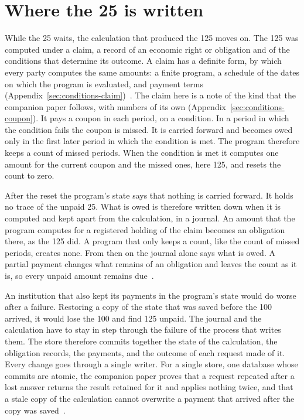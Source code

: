 \documentclass{momentum}
\begin{document}
\section{Where the 25 is written}
\label{sec:coupon}
\label{sec:history}

While the 25 waits, the calculation that produced the 125 moves on. The 125 was computed under a claim, a record of an economic right or obligation and of the conditions that determine its outcome. A claim has a definite form, by which every party computes the same amounts: a finite program, a schedule of the dates on which the program is evaluated, and payment terms (Appendix~\ref{sec:conditions-claim})~\cite{claim}. The claim here is a note of the kind that the companion paper follows, with numbers of its own (Appendix~\ref{sec:conditions-coupon}). It pays a coupon in each period, on a condition. In a period in which the condition fails the coupon is missed. It is carried forward and becomes owed only in the first later period in which the condition is met. The program therefore keeps a count of missed periods. When the condition is met it computes one amount for the current coupon and the missed ones, here 125, and resets the count to zero.

After the reset the program's state says that nothing is carried forward. It holds no trace of the unpaid 25. What is owed is therefore written down when it is computed and kept apart from the calculation, in a journal. An amount that the program computes for a registered holding of the claim becomes an obligation there, as the 125 did. A program that only keeps a count, like the count of missed periods, creates none. From then on the journal alone says what is owed. A partial payment changes what remains of an obligation and leaves the count as it is, so every unpaid amount remains due~\cite[Corollary~3.3]{claim}.

An institution that also kept its payments in the program's state would do worse after a failure. Restoring a copy of the state that was saved before the 100 arrived, it would lose the 100 and find 125 unpaid. The journal and the calculation have to stay in step through the failure of the process that writes them. The store therefore commits together the state of the calculation, the obligation records, the payments, and the outcome of each request made of it. Every change goes through a single writer. For a single store, one database whose commits are atomic, the companion paper proves that a request repeated after a lost answer returns the result retained for it and applies nothing twice, and that a stale copy of the calculation cannot overwrite a payment that arrived after the copy was saved~\cite[Section~5.1]{claim}.
\end{document}
